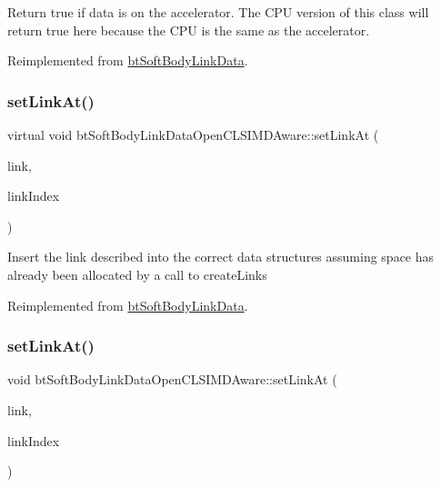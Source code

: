 Return true if data is on the accelerator. The C\+PU version of this class will return true here because the C\+PU is the same as the accelerator. 

Reimplemented from \hyperlink{classbtSoftBodyLinkData_ae284c2a182ddf82dde057a8c2eb17ac3}{bt\+Soft\+Body\+Link\+Data}.

\mbox{\label{classbtSoftBodyLinkDataOpenCLSIMDAware_a02bc02902c70fab9bc96d6d8adcc69b5}} 
\subsubsection{\texorpdfstring{set\+Link\+At()}{setLinkAt()}\hspace{0.1cm}{\footnotesize\ttfamily [1/2]}}
{\footnotesize\ttfamily virtual void bt\+Soft\+Body\+Link\+Data\+Open\+C\+L\+S\+I\+M\+D\+Aware\+::set\+Link\+At (\begin{DoxyParamCaption}\item[{const \hyperlink{classbtSoftBodyLinkData_1_1LinkDescription}{Link\+Description} \&}]{link,  }\item[{int}]{link\+Index }\end{DoxyParamCaption})\hspace{0.3cm}{\ttfamily [virtual]}}

Insert the link described into the correct data structures assuming space has already been allocated by a call to create\+Links 

Reimplemented from \hyperlink{classbtSoftBodyLinkData_a44f200dcb878405cebf3704dc7a8b8cd}{bt\+Soft\+Body\+Link\+Data}.

\mbox{\label{classbtSoftBodyLinkDataOpenCLSIMDAware_a9a1482f91ff8105f41a1f991e183e120}} 
\subsubsection{\texorpdfstring{set\+Link\+At()}{setLinkAt()}\hspace{0.1cm}{\footnotesize\ttfamily [2/2]}}
{\footnotesize\ttfamily void bt\+Soft\+Body\+Link\+Data\+Open\+C\+L\+S\+I\+M\+D\+Aware\+::set\+Link\+At (\begin{DoxyParamCaption}\item[{const \hyperlink{classbtSoftBodyLinkData_1_1LinkDescription}{Link\+Description} \&}]{link,  }\item[{int}]{link\+Index }\end{DoxyParamCaption})\hspace{0.3cm}{\ttfamily [virtual]}}

